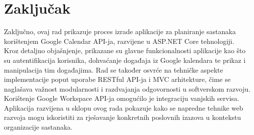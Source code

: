 \documentclass{foi}
\begin{document}
\chapter{Zaključak}
Zaključno, ovaj rad prikazuje proces izrade aplikacije za planiranje sastanaka korištenjem Google Calendar API-ja, razvijene u ASP.NET Core tehnologiji. Kroz detaljno objašnjenje, prikazane su glavne funkcionalnosti aplikacije kao što su autentifikacija korisnika, dohvaćanje događaja iz Google kalendara te prikaz i manipulacija tim događajima. Rad se također osvrće na tehničke aspekte implementacije poput uporabe RESTful API-ja i MVC arhitekture, čime se naglašava važnost modularnosti i razdvajanja odgovornosti u softverskom razvoju. Korištenje Google Workspace API-ja omogućilo je integraciju vanjskih servisa. Aplikacija razvijena u sklopu ovog rada pokazuje kako se napredne tehnike web razvoja mogu iskoristiti za rješavanje konkretnih poslovnih izazova u kontekstu organizacije sastanaka.
\printbibliography[title=Popis literature]

\listoffigures
{}
\end{document}
